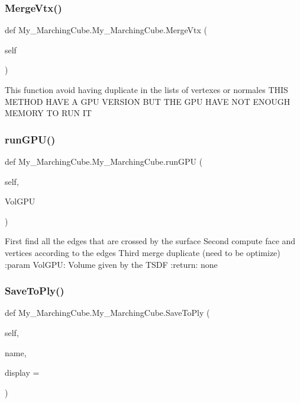 \subsubsection{Merge\+Vtx()}
{\footnotesize\ttfamily def My\+\_\+\+Marching\+Cube.\+My\+\_\+\+Marching\+Cube.\+Merge\+Vtx (\begin{DoxyParamCaption}\item[{}]{self }\end{DoxyParamCaption})}

\begin{DoxyVerb}This function avoid having duplicate in the lists of vertexes or normales
THIS METHOD HAVE A GPU VERSION BUT THE GPU HAVE NOT ENOUGH MEMORY TO RUN IT
\end{DoxyVerb}
 \mbox{\label{class_my___marching_cube_1_1_my___marching_cube_a820edf1a7b295d5e3fbe858bddc03423}} 
\subsubsection{run\+G\+P\+U()}
{\footnotesize\ttfamily def My\+\_\+\+Marching\+Cube.\+My\+\_\+\+Marching\+Cube.\+run\+G\+PU (\begin{DoxyParamCaption}\item[{}]{self,  }\item[{}]{Vol\+G\+PU }\end{DoxyParamCaption})}

\begin{DoxyVerb}First find all the edges that are crossed by the surface
Second compute face and vertices according to the edges
Third merge duplicate (need to be optimize)
:param VolGPU: Volume given by the TSDF
:return: none
\end{DoxyVerb}
 \mbox{\label{class_my___marching_cube_1_1_my___marching_cube_a9ba8a5429eed6fbbe83798c4988e65f4}} 
\subsubsection{Save\+To\+Ply()}
{\footnotesize\ttfamily def My\+\_\+\+Marching\+Cube.\+My\+\_\+\+Marching\+Cube.\+Save\+To\+Ply (\begin{DoxyParamCaption}\item[{}]{self,  }\item[{}]{name,  }\item[{}]{display = {} }\end{DoxyParamCaption})}

